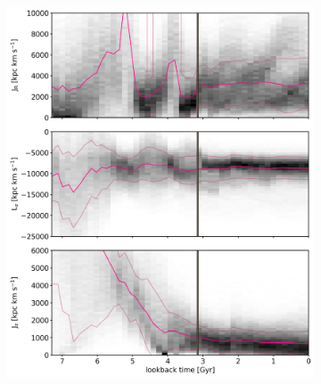\begin{figure}[htbp]
\captionsetup{format=plain}
    \begin{subfigure}[c]{0.48\textwidth}
    \centering
    	\includegraphics[width=\textwidth]{plots/Dynamics/prog2/action_time_evolution_hist_mean_prog2.png}
    \end{subfigure}
    ~
    \begin{subfigure}[c]{0.48\textwidth}
    \centering

\end{subfigure}
\end{figure}
